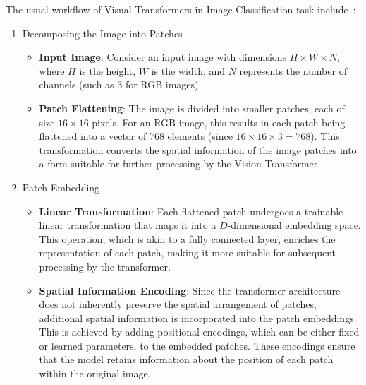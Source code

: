 \documentclass[12pt,a4paper]{report}
\begin{document}
The usual workflow of Visual Transformers in Image Classification task include~\cite{vit}:

\begin{enumerate}
  \item Decomposing the Image into Patches
        \begin{itemize}
          \item \textbf{Input Image}: Consider an input image with dimensions \( H \times W \times N \), where \( H \) is the height, \( W \) is the width, and \( N \) represents the number of channels (such as 3 for RGB images).
          \item \textbf{Patch Flattening}: The image is divided into smaller patches, each of size \( 16 \times 16 \) pixels. For an RGB image, this results in each patch being flattened into a vector of 768 elements (since \( 16 \times 16 \times 3 = 768 \)). This transformation converts the spatial information of the image patches into a form suitable for further processing by the Vision Transformer.
        \end{itemize}

  \item Patch Embedding
        \begin{itemize}
          \item \textbf{Linear Transformation}: Each flattened patch undergoes a trainable linear transformation that maps it into a \( D \)-dimensional embedding space. This operation, which is akin to a fully connected layer, enriches the representation of each patch, making it more suitable for subsequent processing by the transformer.
          \item \textbf{Spatial Information Encoding}: Since the transformer architecture does not inherently preserve the spatial arrangement of patches, additional spatial information is incorporated into the patch embeddings. This is achieved by adding positional encodings, which can be either fixed or learned parameters, to the embedded patches. These encodings ensure that the model retains information about the position of each patch within the original image.
        \end{itemize}


\end{enumerate}
\end{document}
